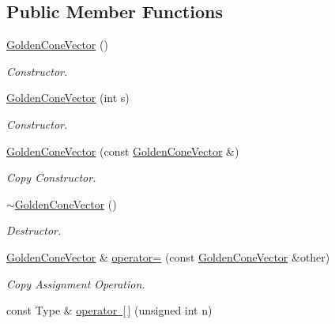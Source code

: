 \subsection*{Public Member Functions}
\begin{DoxyCompactItemize}
\item 
\mbox{\label{class_golden_cone_vector_af61dbdecb7e52655da8a26353437e2f2}} 
\mbox{\hyperlink{class_golden_cone_vector_af61dbdecb7e52655da8a26353437e2f2}{Golden\+Cone\+Vector}} ()
\begin{DoxyCompactList}\small\item\em Constructor. \end{DoxyCompactList}\item 
\mbox{\hyperlink{class_golden_cone_vector_a71f4b758ace85746a4ad04625191e475}{Golden\+Cone\+Vector}} (int s)
\begin{DoxyCompactList}\small\item\em Constructor. \end{DoxyCompactList}\item 
\mbox{\hyperlink{class_golden_cone_vector_ab130d9977c128b19b05028a524587f13}{Golden\+Cone\+Vector}} (const \mbox{\hyperlink{class_golden_cone_vector}{Golden\+Cone\+Vector}} \&)
\begin{DoxyCompactList}\small\item\em Copy Constructor. \end{DoxyCompactList}\item 
\mbox{\label{class_golden_cone_vector_a8f8305813d22dae9bf93f2020d95144d}} 
\mbox{\hyperlink{class_golden_cone_vector_a8f8305813d22dae9bf93f2020d95144d}{$\sim$\+Golden\+Cone\+Vector}} ()
\begin{DoxyCompactList}\small\item\em Destructor. \end{DoxyCompactList}\item 
\mbox{\hyperlink{class_golden_cone_vector}{Golden\+Cone\+Vector}} \& \mbox{\hyperlink{class_golden_cone_vector_adc4c5b8ee0c9b005737c5a01047266cc}{operator=}} (const \mbox{\hyperlink{class_golden_cone_vector}{Golden\+Cone\+Vector}} \&other)
\begin{DoxyCompactList}\small\item\em Copy Assignment Operation. \end{DoxyCompactList}\item 
const Type \& \mbox{\hyperlink{class_golden_cone_vector_ada3090319161478b8c9bb3ca35175774}{operator \mbox{[}$\,$\mbox{]}}} (unsigned int n)

\end{DoxyCompactItemize}
